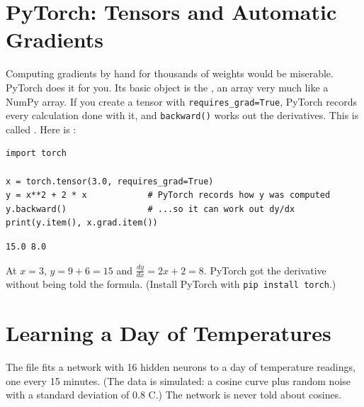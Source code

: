 \section{PyTorch: Tensors and Automatic Gradients}
Computing gradients by hand for thousands of weights would be miserable. PyTorch does it for you. Its basic object
is the , an array very much like a NumPy array. If you create a tensor with
\verb|requires_grad=True|, PyTorch records every calculation done with it, and \verb|backward()| works out the
derivatives. This is called . Here is
:

\begin{verbatim}
import torch

x = torch.tensor(3.0, requires_grad=True)
y = x**2 + 2 * x            # PyTorch records how y was computed
y.backward()                # ...so it can work out dy/dx
print(y.item(), x.grad.item())
\end{verbatim}
\begin{verbatim}
15.0 8.0
\end{verbatim}
At $x = 3$, $y = 9 + 6 = 15$ and $\frac{dy}{dx} = 2x + 2 = 8$. PyTorch got the derivative without being told the
formula. (Install PyTorch with \texttt{pip install torch}.)

\section{Learning a Day of Temperatures}
The file  fits a network with 16 hidden neurons to a day of temperature readings, one
every 15 minutes. (The data is simulated: a cosine curve plus random noise with a standard deviation of
0.8 \textdegree C.) The network is never told about cosines.

